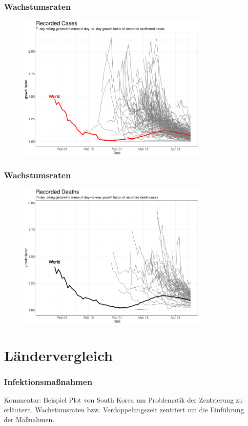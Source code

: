 \documentclass{beamer}
\begin{document}
\begin{frame}
\frametitle{Wachstumsraten}
	\begin{figure}
		\centering
		\includegraphics[width = 270pt]{GF_confirmed}
	\end{figure}
\end{frame}

\begin{frame}
\frametitle{Wachstumsraten}
	\begin{figure}
		\centering
		\includegraphics[width = 270pt]{GF_deaths}
	\end{figure}
\end{frame}

 \section{Ländervergleich}
\begin{frame}
\frametitle{Infektionsmaßnahmen}
	Kommentar: Beispiel Plot von South Korea um Problematik der Zentrierung zu erläutern. Wachstumsraten bzw. Verdoppelungszeit zentriert um die Einführung der Maßnahmen.
\end{frame}
 
\end{document}
